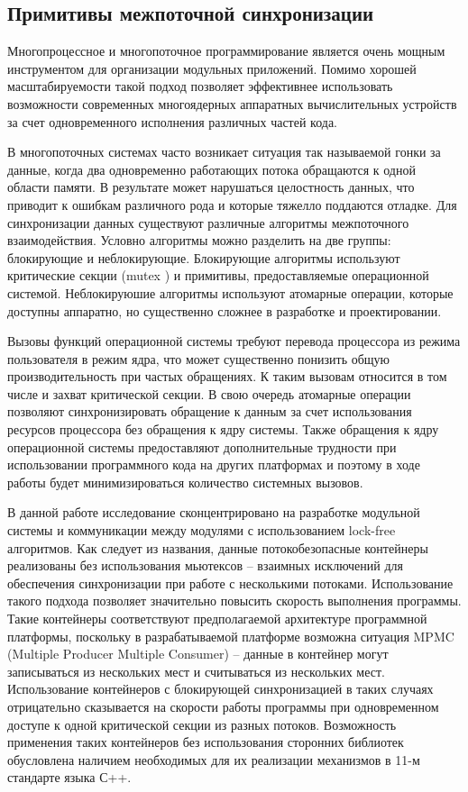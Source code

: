 \subsection{Примитивы межпоточной синхронизации}

Многопроцессное и многопоточное программирование является очень мощным инструментом для организации модульных приложений. Помимо хорошей масштабируемости такой подход позволяет эффективнее использовать возможности современных многоядерных аппаратных вычислительных устройств за счет одновременного исполнения различных частей кода.

В многопоточных системах часто возникает ситуация так называемой гонки за данные, когда два одновременно работающих потока обращаются к одной области памяти. В результате может нарушаться целостность данных, что приводит к ошибкам различного рода и которые тяжелло поддаются отладке. Для синхронизации данных существуют различные алгоритмы межпоточного взаимодействия. Условно алгоритмы можно разделить на две группы: блокирующие и неблокирующие. Блокирующие алгоритмы используют критические секции (mutex ) и примитивы, предоставляемые операционной системой. Неблокируюшие алгоритмы используют атомарные операции, которые доступны аппаратно, но существенно сложнее в разработке и проектировании.

Вызовы функций операционной системы требуют перевода процессора 
из режима пользователя в режим ядра, что может существенно 
понизить общую производительность при частых обращениях. К таким 
вызовам относится в том числе и захват критической секции. В 
свою очередь атомарные операции позволяют синхронизировать 
обращение к данным за счет использования ресурсов процессора без 
обращения к ядру системы. Также обращения к ядру операционной 
системы предоставляют дополнительные трудности при использовании 
программного кода на других платформах и поэтому в ходе работы 
будет минимизироваться количество системных вызовов.

В данной работе исследование сконцентрировано на разработке 
модульной системы и коммуникации между модулями с использованием 
lock-free алгоритмов. Как следует из названия, данные 
потокобезопасные контейнеры реализованы без использования 
мьютексов – взаимных исключений для обеспечения синхронизации 
при работе с несколькими потоками. Использование такого подхода 
позволяет значительно повысить скорость выполнения программы. 
Такие контейнеры соответствуют предполагаемой архитектуре 
программной платформы, поскольку в разрабатываемой платформе 
возможна ситуация MPMC (Multiple Producer Multiple Consumer) – 
данные в контейнер могут записываться из нескольких мест и 
считываться из нескольких мест. Использование контейнеров с 
блокирующей синхронизацией в таких случаях отрицательно 
сказывается на скорости работы программы при одновременном 
доступе к одной критической секции из разных потоков. 
Возможность применения таких контейнеров без использования 
сторонних библиотек обусловлена наличием необходимых для их 
реализации механизмов в 11-м стандарте языка С++.

